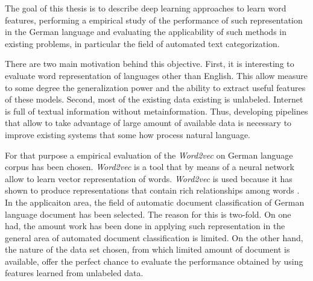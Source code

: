 \label{sec:motivation}

The goal of this thesis is to describe deep learning approaches to learn word features,  performing a empirical study of the performance of such representation in the German language and evaluating the applicability of such methods in existing problems, in particular the field of automated text categorization. 

There are two  main motivation behind this objective. First, it is interesting to evaluate word representation of languages other than English. This allow measure to some degree the generalization power and the ability to extract useful features of these models. Second,  most of the existing data existing is unlabeled. Internet is full of textual information without metainformation. Thus, developing pipelines that allow to take advantage of large amount of available data  is necessary to improve existing systems that some how process natural language.  

For that purpose a empirical evaluation of the \textit{Word2vec} on German
language corpus has been chosen. \textit{Word2vec} is a tool that by means of
a neural network allow to learn vector representation of words.
\textit{Word2vec} is used  because it has shown to produce representations
that contain rich relationships among words . In the applicaiton area, the
field of automatic document classification of German language document has
been selected. The reason for this is two-fold. On one had, the amount  work
has been done in applying such representation  in the general area of
automated document classification is limited. On the other hand, the nature
of the data set chosen,  from which limited amount of document is available,
offer the perfect chance to evaluate the performance obtained by using
features learned from unlabeled data.




